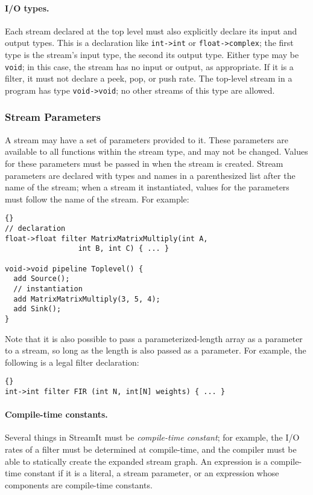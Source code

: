 \documentclass[11pt]{article}
\begin{document}
\paragraph{I/O types.}  Each stream declared at the top level must
also explicitly declare its input and output types.  This is a
declaration like \lstinline|int->int| or \lstinline|float->complex|;
the first type is the stream's input type, the second its output type.
Either type may be \lstinline|void|; in this case, the stream has no
input or output, as appropriate.  If it is a filter, it must not
declare a peek, pop, or push rate.  The top-level stream in a
program has type \lstinline|void->void|; no other streams of this type
are allowed.

\subsubsection{Stream Parameters}

A stream may have a set of parameters provided to it.  These
parameters are available to all functions within the stream type, and
may not be changed.  Values for these parameters must be passed in
when the stream is created.  Stream parameters are declared with types
and names in a parenthesized list after the name of the stream; when a
stream it instantiated, values for the parameters must follow the name
of the stream.  For example:

\begin{lstlisting}{}
// declaration
float->float filter MatrixMatrixMultiply(int A,
                 int B, int C) { ... }

void->void pipeline Toplevel() {
  add Source();
  // instantiation
  add MatrixMatrixMultiply(3, 5, 4);
  add Sink();
}
\end{lstlisting}

Note that it is also possible to pass a parameterized-length array as
a parameter to a stream, so long as the length is also passed as a
parameter. For example, the following is a legal filter declaration:

\begin{lstlisting}{}
int->int filter FIR (int N, int[N] weights) { ... }
\end{lstlisting}

\paragraph{Compile-time constants.}  Several things in StreamIt must
be \emph{compile-time constant}; for example, the I/O rates of a
filter must be determined at compile-time, and the compiler must be
able to statically create the expanded stream graph.  An expression is a
compile-time constant if it is a literal, a stream parameter, or an
expression whose components are compile-time constants.
\end{document}

